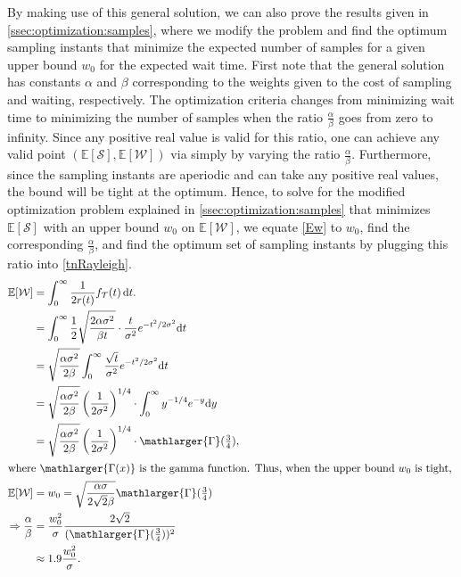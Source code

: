 By making use of this general solution, we can also prove the results given in \cref{ssec:optimization:samples}, where we modify the problem and find the optimum sampling instants that minimize the expected number of samples for a given upper bound $w_0$ for the expected wait time.
First note that the general solution has constants $\alpha$ and $\beta$ corresponding to the weights given to the cost of sampling and waiting, respectively.
The optimization criteria changes from minimizing wait time to minimizing the number of samples when the ratio $\frac{\alpha}{\beta}$ goes from zero to infinity.
Since any positive real value is valid for this ratio, one can achieve any valid point $(\mathbb{E}[\mathcal{S}],\mathbb{E}[\mathcal{W}])$ via simply by varying the ratio $\frac{\alpha}{\beta}$.
\newpage%
Furthermore, since the sampling instants are aperiodic and can take any positive real values, the bound will be tight at the optimum.
Hence, to solve for the modified optimization problem explained in \cref{ssec:optimization:samples} that minimizes $\mathbb{E}[\mathcal{S}]$ with an upper bound $w_0$ on $\mathbb{E}[\mathcal{W}]$, we equate \cref{Ew} to $w_0$, find the corresponding $\frac{\alpha}{\beta}$, and find the optimum set of sampling instants by plugging this ratio into \cref{tnRayleigh}.
\begin{alignat*}{1}
    \mathbb{E}[\mathcal{W}]&=\int_{0}^{\infty}\dfrac{1}{2r(t)}f_\mathcal{T}(t)\,\mathrm{d}t.\nonumber\\
    &=\int_{0}^{\infty}\frac{1}{2}\sqrt{\frac{2\alpha\sigma^2}{\beta t}}\cdot \frac{t}{\sigma^2}e^{-{t^2}/{2\sigma^2}}\mathrm{d}t\\
    &=\sqrt{\frac{\alpha\sigma^2}{2\beta}}\int_{0}^{\infty}\frac{\sqrt{t}}{\sigma^2}e^{-{t^2}/{2\sigma^2}}\mathrm{d}t\\
    &=\sqrt{\frac{\alpha\sigma^2}{2\beta}}\left({\frac{1}{{2}\sigma^2}}\right)^{1/4}\cdot\int_{0}^{\infty}y^{-1/4}e^{-y}\mathrm{d}y\\
    &=\sqrt{\frac{\alpha\sigma^2}{2\beta}}\left({\frac{1}{{2}\sigma^2}}\right)^{1/4}\cdot\mathlarger{\Gamma}(\tfrac{3}{4}),\\
    \intertext{%
        where $\mathlarger{\Gamma(x)}$ is the gamma function.
        Thus, when the upper bound $w_0$ is tight,
    }
    \mathbb{E}[\mathcal{W}]&=w_0=\sqrt{\frac{\alpha\sigma}{2\sqrt{2}\beta}}\mathlarger{\Gamma}(\tfrac{3}{4})\\
    \Rightarrow\frac{\alpha}{\beta}&=\frac{w_0^2}{\sigma}\frac{2\sqrt{2}}{(\mathlarger{\Gamma}(\tfrac{3}{4}))^2}\\
    &\approx1.9\frac{w_0^2}{\sigma}.
\end{alignat*}
